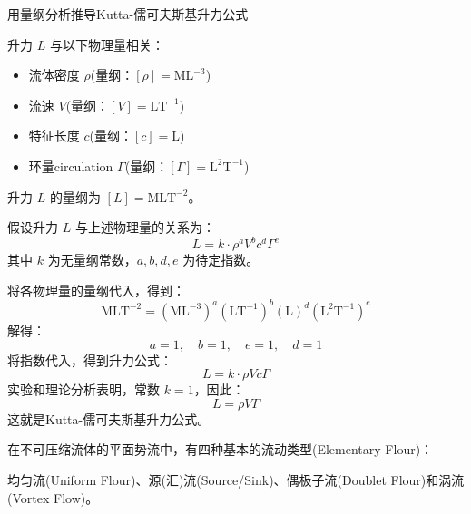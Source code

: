 \begin{example}
    用量纲分析推导Kutta-儒可夫斯基升力公式
\begin{tui}
\begin{flushleft}
    升力 \( L \) 与以下物理量相关：
    \begin{itemize}
        \item 流体密度 \( \rho \)(量纲：\( [\rho] = \text{ML}^{-3} \))
        \item 流速 \( V \)(量纲：\( [V] = \text{LT}^{-1} \))
        \item 特征长度 \( c \)(量纲：\( [c] = \text{L} \))
        \item 环量circulation \( \Gamma \)(量纲：\( [\Gamma] = \text{L}^2\text{T}^{-1} \))
    \end{itemize}
升力 \( L \) 的量纲为 \( [L] = \text{MLT}^{-2} \)。
\end{flushleft}
\qquad 假设升力 \( L \) 与上述物理量的关系为：
\[
L = k \cdot \rho^a V^b c^d \Gamma^e
\]
其中 \( k \) 为无量纲常数，\( a, b, d, e \) 为待定指数。

将各物理量的量纲代入，得到：
\[
\text{MLT}^{-2} = (\text{ML}^{-3})^a (\text{LT}^{-1})^b (\text{L})^d (\text{L}^2\text{T}^{-1})^e
\]
解得：
\[
a = 1, \quad b = 1, \quad e = 1, \quad d = 1
\]
将指数代入，得到升力公式：
\[
L = k \cdot \rho V c \Gamma
\]
实验和理论分析表明，常数 \( k = 1 \)，因此：
\[
L = \rho V \Gamma
\]
这就是Kutta-儒可夫斯基升力公式。
\end{tui}
\end{example}
\begin{defn}
    在不可压缩流体的平面势流中，有四种基本的流动类型(Elementary Flour)：
    
    均匀流(Uniform Flour)、源(汇)流(Source/Sink)、偶极子流(Doublet Flour)和涡流(Vortex Flow)。
\end{defn}
